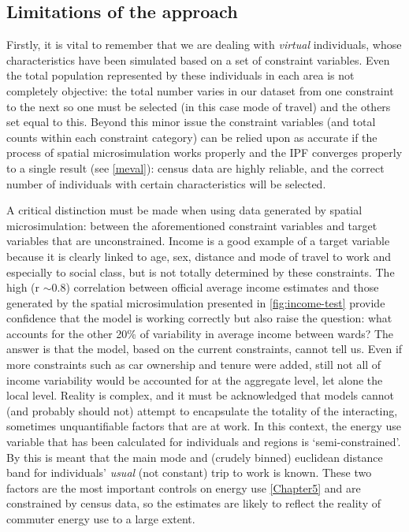 \documentclass[a4paper, 11pt, twoside]{Thesis}
\begin{document}
\subsection{Limitations of the approach} \label{s:uncertainties}
Firstly, it is vital to remember that we are dealing with \emph{virtual}
individuals, whose characteristics have been simulated based on a set of
constraint variables. Even the total population represented by these individuals
in each area is not completely objective: the total number varies in our
dataset from one constraint to the next so one must be selected (in this
case mode of travel) and the others set equal to this. Beyond this minor issue
the constraint variables (and total counts within each constraint category)
can be relied upon as accurate if the process of spatial microsimulation
works properly and the IPF converges properly to a single result (see
\cref{meval}): census data are highly reliable, and the correct number
of individuals with certain characteristics will be selected.

A critical distinction must be made when using data generated by
spatial microsimulation: between the aforementioned constraint variables and
target variables that are unconstrained. Income is a good example of a target
variable because it is clearly linked to age, sex, distance and mode of travel to work and
especially to social class, but is not totally determined by these constraints.
The high (r $\sim$0.8) correlation between official average income estimates and those generated
by the spatial microsimulation presented in \cref{fig:income-test} provide confidence
that the model is working correctly but also raise the question: what accounts for the
other 20\% of variability in average income between wards?
The answer is that the model, based on the current constraints, cannot tell us.
Even if more constraints such as car ownership and tenure were added, still not all of
income variability would be accounted for at the aggregate level, let alone the local
level. Reality is complex, and it must be acknowledged that models cannot (and probably
should not) attempt to encapsulate the totality of the interacting, sometimes unquantifiable
factors that are at work. In this context, the energy use variable that has been
calculated for individuals and regions is `semi-constrained'. By this is meant
that the main mode and (crudely binned) euclidean distance band for
individuals' \emph{usual} (not constant) trip to work is known. These two
factors are the
most important controls on energy use \cref{Chapter5} and are constrained by
census data, so the estimates are likely to reflect the reality of commuter
energy use to a large extent. 
\end{document}
